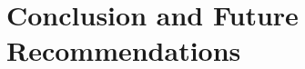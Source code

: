 \documentclass[letterpaper, 10pt, conference]{ieeeconf}
\begin{document}

\section{Conclusion and Future Recommendations}
\label{sec:Conclusion}





\end{document}
